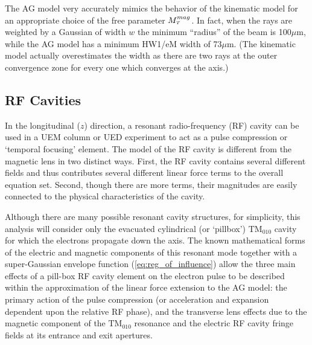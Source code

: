 The AG model very accurately mimics the behavior of the kinematic model for an appropriate choice of the free parameter $M_{{\scriptscriptstyle T}}^{mag}$.
In fact, when the rays are weighted by a Gaussian of width $w$ the minimum ``radius'' of the beam is 100$\mu$m, while the AG model has a minimum HW1/eM width of 73$\mu$m.
(The kinematic model actually overestimates the width as there are two rays at the outer convergence zone for every one which converges at the axis.) %

\subsection{RF Cavities}

In the longitudinal ($ z $) direction, a resonant radio-frequency (RF) cavity can be used in a UEM column or UED experiment \cite{oudheusden_electron_2007,fill_sub-fs_2006} to act as a pulse compression or `temporal focusing' element.
The model of the RF cavity is different from the magnetic lens in two distinct ways.
First, the RF cavity contains several different fields and thus contributes several different linear force terms to the overall equation set.
Second, though there are more terms, their magnitudes are easily connected to the physical characteristics of the cavity.

Although there are many possible resonant cavity structures,\cite{oudheusden_electron_2007,humphries_principles_1986} for simplicity, this analysis will consider only the evacuated cylindrical (or `pillbox') $\text{TM}_{010}$ cavity for which the electrons propagate down the axis.\cite{fill_sub-fs_2006,humphries_principles_1986}
The known mathematical forms of the electric and magnetic components of this resonant mode together with a super-Gaussian envelope function (\ref{eq:reg_of_influence}) allow the three main effects of a pill-box RF cavity element on the electron pulse to be described within the approximation of the linear force extension to the AG model: the primary action of the pulse compression (or acceleration and expansion dependent upon the relative RF phase), and the transverse lens effects due to the magnetic component of the $\text{TM}_{010}$ resonance and the electric RF cavity fringe fields at its entrance and exit apertures.\cite{kim_rf_1989}


